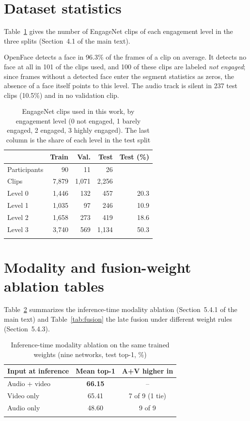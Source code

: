 \documentclass[pdflatex,sn-basic]{sn-jnl}
\begin{document}
\section{Dataset statistics}\label{sec:s_dataset}

Table~\ref{tab:dataset} gives the number of EngageNet clips of each engagement level in the three splits (Section~4.1 of the main text).

OpenFace detects a face in 96.3\% of the frames of a clip on average. It detects no face at all in 101 of the clips used, and 100 of these clips are labeled \emph{not engaged}; since frames without a detected face enter the segment statistics as zeros, the absence of a face itself points to this level. The audio track is silent in 237 test clips (10.5\%) and in no validation clip.

\begin{table}[t]
\caption{EngageNet clips used in this work, by engagement level (0 not engaged, 1 barely engaged, 2 engaged, 3 highly engaged). The last column is the share of each level in the test split}\label{tab:dataset}
\begin{tabular*}{0.6\textwidth}{@{\extracolsep\fill}lrrrr}
\toprule
 & Train & Val. & Test & Test (\%)\\
\midrule
Participants & 90 & 11 & 26 & \\
Clips & 7,879 & 1,071 & 2,256 & \\
\midrule
Level 0 & 1,446 & 132 & 457 & 20.3\\
Level 1 & 1,035 & 97 & 246 & 10.9\\
Level 2 & 1,658 & 273 & 419 & 18.6\\
Level 3 & 3,740 & 569 & 1,134 & 50.3\\
\botrule
\end{tabular*}
\end{table}

\section{Modality and fusion-weight ablation tables}\label{sec:s_modfus}

Table~\ref{tab:modality} summarizes the inference-time modality ablation (Section~5.4.1 of the main text) and Table~\ref{tab:fusion} the late fusion under different weight rules (Section~5.4.3).

\begin{table}[t]
\caption{Inference-time modality ablation on the same trained weights (nine networks, test top-1, \%)}\label{tab:modality}
\begin{tabular*}{0.6\textwidth}{@{\extracolsep\fill}lcc}
\toprule
Input at inference & Mean top-1 & A+V higher in\\
\midrule
Audio + video & \textbf{66.15} & --\\
Video only & 65.41 & 7 of 9 (1 tie)\\
Audio only & 48.60 & 9 of 9\\
\botrule
\end{tabular*}
\end{table}
\end{document}
